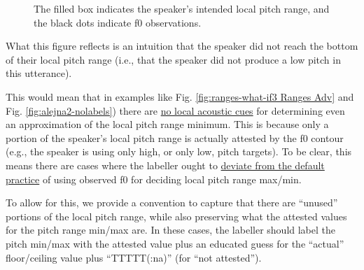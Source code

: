 \documentclass[11pt, twoside]{memoir}
\begin{document}
\begin{figure}[H]
\centering
{}
\caption{The filled box indicates the speaker’s intended local pitch range, and the black dots indicate f0 observations.%
\label{fig:ranges intuition alejna2}%
}
\end{figure}

What this figure reflects is an intuition that the speaker did not reach the bottom of their local pitch range (i.e., that the speaker did not produce a low pitch in this utterance).

This would mean that in examples like Fig. \ref{fig:ranges-what-if3 Ranges Adv} and Fig. \ref{fig:alejna2-nolabels}) there are \uline{no local acoustic cues} for determining even an approximation of the local pitch range minimum. This is because only a portion of the speaker’s local pitch range is actually attested by the f0 contour (e.g., the speaker is using only high, or only low, pitch targets). To be clear, this means there are cases where the labeller ought to \uline{deviate from the default practice} of using observed f0 for deciding local pitch range max\slash min.

To allow for this, we provide a convention to capture that there are “unused” portions of the local pitch range, while also preserving what the attested values for the pitch range min\slash max are. In these cases, the labeller should label the pitch min\slash max with the attested value plus an educated guess for the “actual” floor\slash ceiling value plus “TTTTT(:na)” (for “not attested”).
\end{document}
